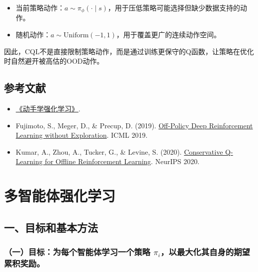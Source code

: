 \begin{itemize}
\tightlist
\item
  当前策略动作：\(a\sim\pi_\phi(\cdot\mid s)\)，用于压低策略可能选择但缺少数据支持的动作。
\item
  随机动作：\(a\sim\mathrm{Uniform}(-1,1)\)，用于覆盖更广的连续动作空间。
\end{itemize}

因此，CQL不是直接限制策略动作，而是通过训练更保守的Q函数，让策略在优化时自然避开被高估的OOD动作。

\hypertarget{ux53c2ux8003ux6587ux732e-62}{%
\subsection{参考文献}\label{ux53c2ux8003ux6587ux732e-62}}

\begin{itemize}
\tightlist
\item
  \href{https://hrl.boyuai.com/}{《动手学强化学习》}.
\item
  Fujimoto, S., Meger, D., \& Precup, D. (2019). \href{https://arxiv.org/abs/1812.02900}{Off-Policy Deep Reinforcement Learning without Exploration}. ICML 2019.
\item
  Kumar, A., Zhou, A., Tucker, G., \& Levine, S. (2020). \href{https://arxiv.org/abs/2006.04779}{Conservative Q-Learning for Offline Reinforcement Learning}. NeurIPS 2020.
\end{itemize}

\clearpage

\hypertarget{ux591aux667aux80fdux4f53ux5f3aux5316ux5b66ux4e60}{%
\section{多智能体强化学习}\label{ux591aux667aux80fdux4f53ux5f3aux5316ux5b66ux4e60}}

\hypertarget{ux4e00ux76eeux6807ux548cux57faux672cux65b9ux6cd5}{%
\subsection{一、目标和基本方法}\label{ux4e00ux76eeux6807ux548cux57faux672cux65b9ux6cd5}}

\hypertarget{ux4e00ux76eeux6807ux4e3aux6bcfux4e2aux667aux80fdux4f53ux5b66ux4e60ux4e00ux4e2aux7b56ux7565-pi_iux4ee5ux6700ux5927ux5316ux5176ux81eaux8eabux7684ux671fux671bux7d2fux79efux5956ux52b1}{%
\subsubsection{\texorpdfstring{（一）目标：为每个智能体学习一个策略 \(\pi_i\)，以最大化其自身的期望累积奖励。}{（一）目标：为每个智能体学习一个策略 \textbackslash pi\_i，以最大化其自身的期望累积奖励。}}\label{ux4e00ux76eeux6807ux4e3aux6bcfux4e2aux667aux80fdux4f53ux5b66ux4e60ux4e00ux4e2aux7b56ux7565-pi_iux4ee5ux6700ux5927ux5316ux5176ux81eaux8eabux7684ux671fux671bux7d2fux79efux5956ux52b1}}

